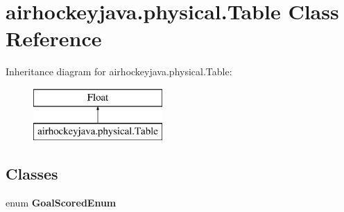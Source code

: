 \hypertarget{classairhockeyjava_1_1physical_1_1_table}{}\section{airhockeyjava.\+physical.\+Table Class Reference}
\label{classairhockeyjava_1_1physical_1_1_table}
Inheritance diagram for airhockeyjava.\+physical.\+Table\+:\begin{figure}[H]
\begin{center}
\leavevmode
\includegraphics[height=2.000000cm]{classairhockeyjava_1_1physical_1_1_table}
\end{center}
\end{figure}
\subsection*{Classes}
\begin{DoxyCompactItemize}
\item 
enum {\bfseries Goal\+Scored\+Enum}
\end{DoxyCompactItemize}
